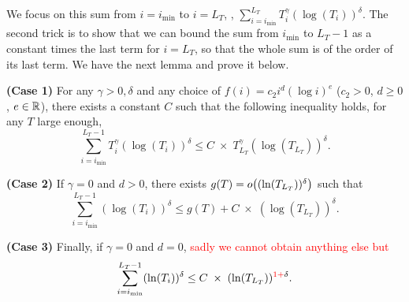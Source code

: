 \documentclass[12pt]{colt2018} %
\begin{document}
We focus on this sum from $i=i_{\min}$ to $i=L_T$, \ie, $\sum_{i=i_{\min}}^{L_T} T_i^{\gamma} (\log(T_i))^{\delta}$.
The second trick is to show that we can bound the sum from $i_{\min}$ to $L_T-1$ as a constant times the last term for $i=L_T$, so that the whole sum is of the order of its last term.
We have the next lemma and prove it below.

\begin{lemma}\label{lem:unifiedUpperBound}
    \textbf{(Case 1)}
    For any $\gamma > 0,\delta$ and any choice of $f(i) = c_2 i^d (\log i)^e$ ($c_2>0$, $d\geq0$, $e\in\R$),
    there exists a constant $C$ such that the following inequality holds,
    for any $T$ large enough,
    \begin{equation}\label{eq:unifiedUpperBound1}
        \sum_{i=i_{\min}}^{L_T - 1} T_i^{\gamma} (\log(T_i))^{\delta}
        \leq C \; \times \; T_{L_T}^{\gamma} (\log(T_{L_T}))^{\delta}.
    \end{equation}

    \textbf{(Case 2)}
    If $\gamma = 0$ and $d > 0$,
    there exists $g(T) = \smallO{(\log(T_{L_T}))^{\delta}}$ such that
    \begin{equation}\label{eq:unifiedUpperBound2}
        \sum_{i=i_{\min}}^{L_T - 1} (\log(T_i))^{\delta}
        \leq g(T) + C \; \times \; (\log(T_{L_T}))^{\delta}.
    \end{equation}

    \textbf{(Case 3)}
    Finally, if $\gamma = 0$ and $d = 0$, \textcolor{red}{sadly we cannot obtain anything else but}
    \begin{equation}\label{eq:unifiedUpperBound3}
        \sum_{i=i_{\min}}^{L_T - 1} (\log(T_i))^{\delta}
        \leq C \; \times \; (\log(T_{L_T}))^{\textcolor{red}{1+}\delta}.
    \end{equation}
\end{lemma}


\hr{}
\end{document}
